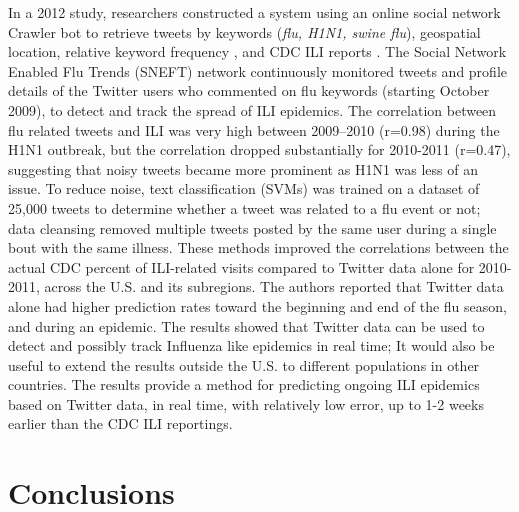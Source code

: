 \documentclass[sigconf]{acmart}
\begin{document}
In a 2012 study, researchers constructed a system using an online social network Crawler 
bot to retrieve tweets by keywords ({\it flu, H1N1, swine flu}), geospatial location, 
relative keyword frequency , and CDC ILI reports \cite{achrekar12}. The Social Network 
Enabled Flu Trends (SNEFT) network continuously monitored tweets and profile details of 
the Twitter users who commented on flu keywords (starting October 2009), to detect and 
track the spread of ILI epidemics. The correlation between flu related tweets and ILI 
was  very high between 2009–2010 (r=0.98) during the H1N1 outbreak, but the correlation 
dropped substantially for 2010-2011 (r=0.47), suggesting that noisy tweets became more 
prominent as H1N1 was less of an issue. To reduce noise, text classification (SVMs) was 
trained on a dataset of 25,000 tweets to determine whether a tweet was related to a flu 
event or not; data cleansing removed multiple tweets posted by the same user during a 
single bout with the same illness. These methods improved the correlations between the 
actual CDC percent of ILI-related visits compared to Twitter data alone for 2010-2011, 
across the U.S. and its subregions. The authors reported that Twitter data alone had 
higher prediction rates toward the beginning and end of the flu season, and during an 
epidemic. The results showed that Twitter data can be used to detect and possibly track 
Influenza like epidemics in real time; It would also be useful to extend the results 
outside the U.S. to different populations in other countries. The results provide a method 
for predicting ongoing ILI epidemics based on Twitter data, in real time, with relatively 
low error, up to 1-2 weeks earlier than the CDC ILI reportings. 


\section{Conclusions}
\end{document}
